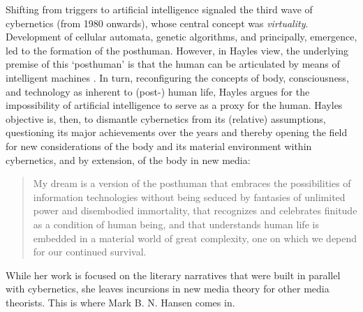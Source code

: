 Shifting from triggers to artificial intelligence signaled the third wave of cybernetics (from 1980 onwards), whose central concept was \textit{virtuality}. Development of cellular automata, genetic algorithms, and principally, emergence, led to the formation of the posthuman. However, in Hayles view, the underlying premise of this `posthuman' is that the human can be articulated by means of intelligent machines \parencite[17-8]{Hay99:How}. In turn, reconfiguring the concepts of body, consciousness, and technology as inherent to (post-) human life, Hayles argues for the impossibility of artificial intelligence to serve as a proxy for the human. Hayles objective is, then, to dismantle cybernetics from its (relative) assumptions, questioning its major achievements over the years and thereby opening the field for new considerations of the body and its material environment within cybernetics, and by extension, of the body in new media:

\begin{quote}
	My dream is a version of the posthuman that embraces the possibilities of information technologies without being seduced by fantasies of unlimited power and disembodied immortality, that recognizes and celebrates finitude as a condition of human being, and that understands human life is embedded in a material world of great complexity, one on which we depend for our continued survival. \parencite[5]{Hay99:How}
\end{quote}

While her work is focused on the literary narratives that were built in parallel with cybernetics, she leaves incursions in new media theory for other media theorists. This is where Mark B. N. Hansen comes in.
